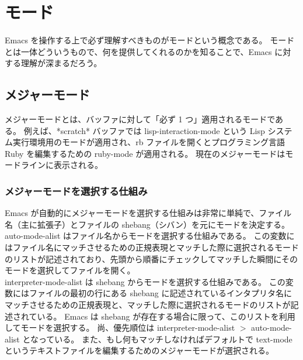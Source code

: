\section{モード}
Emacs を操作する上で必ず理解すべきものがモードという概念である。
モードとは一体どういうもので、何を提供してくれるのかを知ることで、Emacs に対する理解が深まるだろう。
\subsection{メジャーモード}
メジャーモードとは、バッファに対して「必ず 1 つ」適用されるモードである。
例えば、*scratch* バッファでは lisp-interaction-mode という Lisp システム実行環境用のモードが適用され、rb ファイルを開くとプログラミング言語 Ruby を編集するための ruby-mode が適用される。
現在のメジャーモードはモードラインに表示される。
\subsubsection{メジャーモードを選択する仕組み}
Emacs が自動的にメジャーモードを選択する仕組みは非常に単純で、ファイル名（主に拡張子）とファイルの shebang（シバン）を元にモードを決定する。\\

auto-mode-alist はファイル名からモードを選択する仕組みである。
この変数にはファイル名にマッチさせるための正規表現とマッチした際に選択されるモードのリストが記述されており、先頭から順番にチェックしてマッチした瞬間にそのモードを選択してファイルを開く。\\

interpreter-mode-alist は shebang からモードを選択する仕組みである。
この変数にはファイルの最初の行にある shebang に記述されているインタプリタ名にマッチさせるための正規表現と、マッチした際に選択されるモードのリストが記述されている。
Emacs は shebang が存在する場合に限って、このリストを利用してモードを選択する。
尚、優先順位は interpreter-mode-alist $>$ auto-mode-alist となっている。
また、もし何もマッチしなければデフォルトで text-mode というテキストファイルを編集するためのメジャーモードが選択される。
